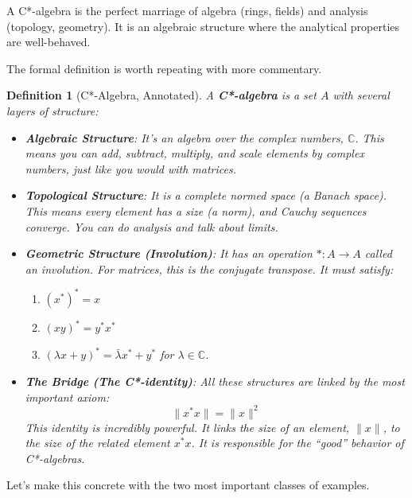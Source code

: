 \documentclass[11pt, a4paper]{article}
\theoremstyle{colored_def}
\newtheorem{definition}{Definition}[section]
\theoremstyle{colored_thm}
\theoremstyle{colored_ex}
\newcommand{\C}{\mathbb{C}}
\begin{document}
A C*-algebra is the perfect marriage of algebra (rings, fields) and analysis (topology, geometry). It is an algebraic structure where the analytical properties are well-behaved.

The formal definition is worth repeating with more commentary.

\begin{definition}[C*-Algebra, Annotated]\label{def:cstar}
A \textbf{C*-algebra} is a set $A$ with several layers of structure:
\begin{itemize}
    \item \textbf{Algebraic Structure}: It's an algebra over the complex numbers, $\C$. This means you can add, subtract, multiply, and scale elements by complex numbers, just like you would with matrices.
    \item \textbf{Topological Structure}: It is a complete normed space (a Banach space). This means every element has a size (a norm), and Cauchy sequences converge. You can do analysis and talk about limits.
    \item \textbf{Geometric Structure (Involution)}: It has an operation $*: A \to A$ called an involution. For matrices, this is the conjugate transpose. It must satisfy:
    \begin{enumerate}
        \item $(x^*)^* = x$
        \item $(xy)^* = y^*x^*$
        \item $(\lambda x + y)^* = \bar{\lambda}x^* + y^*$ for $\lambda \in \C$.
    \end{enumerate}
    \item \textbf{The Bridge (The C*-identity)}: All these structures are linked by the most important axiom:
    $$ \|x^*x\| = \|x\|^2 $$
    This identity is incredibly powerful. It links the size of an element, $\|x\|$, to the size of the related element $x^*x$. It is responsible for the ``good'' behavior of C*-algebras.
\end{itemize}
\end{definition}

Let's make this concrete with the two most important classes of examples.
\end{document}
